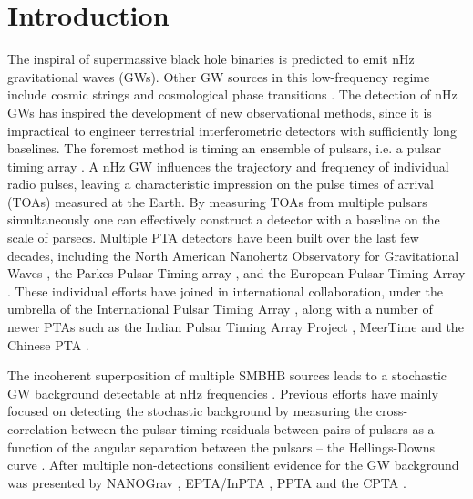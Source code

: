 \documentclass[fleqn,usenatbib,useAMS]{mnras}
\begin{document}
\section{Introduction}\label{sec:intro}
The inspiral of supermassive black hole binaries \citep[SMBHBs;][]{Rajagopal1995,Jaffe_2003, Wyithe2003,Sesana2013,McWilliams_2014,Ravi2015MNRAS.447.2772R,Burke2019, Skyes2022} is predicted to emit nHz gravitational waves (GWs). Other GW sources in this low-frequency regime include cosmic strings \citep[e.g.][]{PTAstring} and cosmological phase transitions \citep[e.g.][]{PTAphase}. The detection of nHz GWs has inspired the development of new observational methods, since it is impractical to engineer terrestrial interferometric detectors with sufficiently long baselines. The foremost method is timing an ensemble of pulsars, i.e. a pulsar timing array \citep[PTA;][]{ Tiburzi2018, 2021hgwa.bookE...4V}. A nHz GW influences the trajectory and frequency of individual radio pulses, leaving a characteristic impression on the pulse times of arrival (TOAs) measured at the  Earth. By measuring TOAs from multiple pulsars simultaneously one can effectively construct a detector with a baseline on the scale of parsecs. Multiple PTA detectors have been built over the last few decades, including the North American Nanohertz Observatory for Gravitational Waves \citep[NANOGrav,][]{NANOgrav2023}, the Parkes Pulsar Timing array \citep[PPTA,][]{Parkes2023}, and the European Pulsar Timing Array \citep[EPTA,][]{EPTA2023}. These individual efforts have joined in international collaboration, under the umbrella of the International Pulsar Timing Array \citep[IPTA,][]{2019MNRAS.490.4666P}, along with a number of newer PTAs such as the Indian Pulsar Timing Array Project \citep[InPTA,][]{ipta}, MeerTime \citep{meertime2,Meertime} and the Chinese PTA \citep[CPTA,][]{Hobbs_2019}. \newline 

The incoherent superposition of multiple SMBHB sources leads to a stochastic GW background detectable at nHz frequencies \citep{Allen1997,Sesana10,Christensen2019,Renzini2022}. Previous efforts have mainly focused on detecting the stochastic background by measuring the cross-correlation between the pulsar timing residuals between pairs of pulsars as a function of the angular separation between the pulsars -- the Hellings-Downs curve \citep{Hellings}. After multiple non-detections \citep{Lentati2015,NanoGrav2018,2022MNRAS.510.4873A} consilient evidence for the GW background was presented by NANOGrav \citep{2023ApJ...951L...8A}, EPTA/InPTA \citep{2023arXiv230616214A}, PPTA \citep{2023ApJ...951L...6R} and the CPTA \citep{2023RAA....23g5024X}. \newline 
\end{document}

